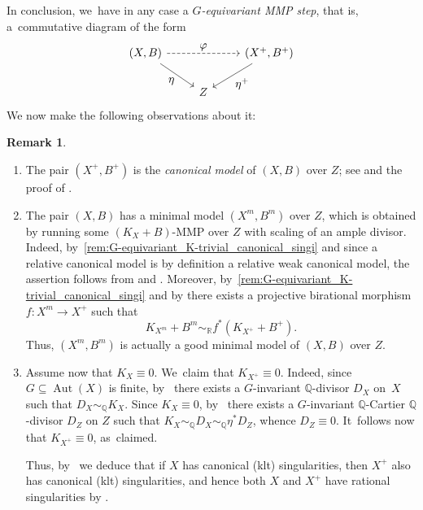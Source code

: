 \documentclass[JEP,XML,SOM,Unicode,published]{cedram}
\let\ts\textstyle
\theoremstyle{plain}
\theoremstyle{definition}
\newtheorem{rem}[thm]{Remark}
\newcommand{\Q}{\mathbb{Q}}
\newcommand{\R}{\mathbb{R}}
\DeclareMathOperator{\Aut}{Aut}
\begin{document}
In conclusion, we~have in any case a \emph{$G$\nobreakdash-equivariant MMP step}, that is, a~commutative diagram of the form
\[
\begin{tikzcd}
(X, B) \arrow[dr, "\ts \eta" swap] \arrow[rr, "\ts \varphi", dashed] && (X^+, B^+) \arrow[dl, "\ts \eta^+"] \\
& Z
\end{tikzcd}
\]
We now make the following observations about it:

\skpt
\begin{rem}
\label{rem:G-equivariant_K-trivial_canonical_sing}
\begin{enumerate}
\item\label{rem:G-equivariant_K-trivial_canonical_singi}
The pair $(X^+,B^+)$ is the \emph{canonical model} of $(X,B)$ over $Z$; see \cite[Def.\,4.8.1]{Fuj17book} and the proof of \cite[Prop.\,4.2.2]{Pro21}.

\item\label{rem:G-equivariant_K-trivial_canonical_singii}
The pair $(X,B)$ has a minimal model $(X^m, B^m)$ over $Z$, which is obtained by running some $(K_X+B)$-MMP over $Z$ with scaling of an ample divisor. Indeed, by~\eqref{rem:G-equivariant_K-trivial_canonical_singi} and since a relative canonical model is by definition a relative weak canonical model, the assertion follows from \cite[Cor.\,3.7]{Bir12a} and \cite[Th.\,1.7]{HH20}.
Moreover, by~\eqref{rem:G-equivariant_K-trivial_canonical_singi} and by \cite[Lem.\,4.8.4]{Fuj17book} there exists a projective birational morphism $ f \colon X^m \to X^+ $ such that
\[
K_{X^m} + B^m \sim_\R f^* (K_{X^+} + B^+).
\]
Thus, $(X^m, B^m)$ is actually a good minimal model of $(X,B)$ over $Z$.

\item\label{rem:G-equivariant_K-trivial_canonical_singiii}
Assume now that $K_X \equiv 0$. We~claim that $K_{X^+} \equiv 0$. Indeed, since $G \subseteq \Aut(X)$ is finite, by~\cite[Lem.\,1.1.2]{Pro21} there exists a $G$\nobreakdash-invariant $\Q$\nobreakdash-divisor $D_X$ on~$X$ such that $D_X \sim_\Q K_X$.
Since $K_X \equiv 0$, by~\cite[Th.\,3.3.1(iii)]{Pro21} there exists a $G$\nobreakdash-invariant $\Q$\nobreakdash-Cartier $\Q$\nobreakdash-divisor $D_Z$ on $Z$ such that $K_X \sim_\Q D_X \sim_\Q \eta^* D_Z$, whence $D_Z \equiv 0$. It~follows now that $K_{X^+} \equiv 0$, as~claimed.

Thus, by~\cite[Lem.\,3.38]{KM98} we deduce that if $X$ has canonical (\resp klt) singularities, then $X^+$ also has canonical (\resp klt) singularities, and hence both $X$ and $X^+$ have rational singularities by \cite[Th.\,5.22]{KM98}.
\end{enumerate}
\end{rem}
\end{document}

